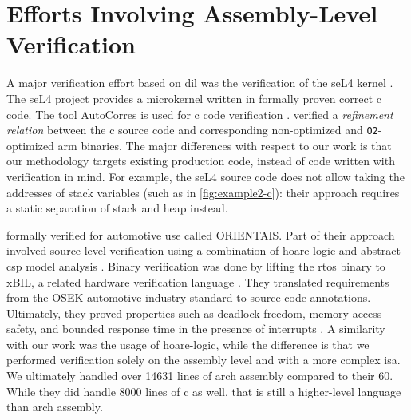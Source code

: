 \begin{comment}
  Building on such models (specifically, the \gls{arm} specification), \textcite{jiang2022examiner} checked for inconsistencies and bugs in \ac{cpu} emulators such as \ac{qemu} and \texttt{angr}\index{angr}.
  They were able to uncover thousands of situations where the instruction stream generated according to the official specification did not match up to that produced by emulators.
  They also uncovered twelve bugs that influenced the behavior of various common instructions.
  We perform a similar validation of our modeling of library functions for exception handling purposes in \cref{ch:eicfg-validation}.
  However, we lack a structured specification to generate semantics from or test against, so we tested against real-world implementations instead (and uncovered several bugs in our model).
\end{comment}

\section{Efforts Involving Assembly-Level Verification}
\label{se:integrated_assembly}
A major verification effort based on \acl{dil}
was the verification of the seL4 kernel \autocite{klein2009sel4,klein2014comprehensive}.
The seL4 project provides a microkernel written in formally proven correct \gls{c} code.
The tool AutoCorres is used for \gls{c} code verification \autocite{greenaway2012bridging}.
\Textcite{sewell2013tvv} verified a \emph{refinement relation} between the \gls{c} source code
and corresponding non-optimized and \lstinline|O2|-optimized \gls{arm} binaries.
The major differences with respect to our work
is that our methodology targets existing production code,
instead of code written with verification in mind.
For example, the seL4 source code does not allow taking the addresses of stack variables
(such as in \cref{fig:example2-c}):
their approach requires a static separation of stack and heap instead.

\Textcite{shi2012orientais} formally verified  for automotive use
called ORIENTAIS.
Part of their approach involved source-level verification
using a combination of \gls{hoare-logic}
and abstract \ac{csp} model analysis \autocite{hoare1978csp}.
Binary verification was done by lifting the \ac{rtos} binary to xBIL,
a related hardware verification language \autocite{shi2012xbil}.
They translated requirements from the OSEK automotive industry standard
to source code annotations.
Ultimately, they proved properties such as deadlock-freedom, memory access safety,
and bounded response time in the presence of interrupts \autocite{shi2012interrupt}.
A similarity with our work was the usage of \gls{hoare-logic},
while the difference is that we performed verification solely on the assembly level
and with a more complex \ac{isa}.
We ultimately handled over \num{14631} lines of \gls{arch} assembly compared to their \num{60}.
While they did handle \num{8000} lines of \gls{c} as well,
that is still a higher-level language than \gls{arch} assembly.

